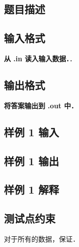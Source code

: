	\subsection*{题目描述}
	\subsection*{输入格式}
	\textbf{从 .in 读入输入数据．}．
	\subsection*{输出格式}
	\textbf{将答案输出到 .out 中．}
	\subsection*{样例 1 输入}
	\subsection*{样例 1 输出}
	\subsection*{样例 1 解释}
	\subsection*{测试点约束}
	对于所有的数据，保证．
